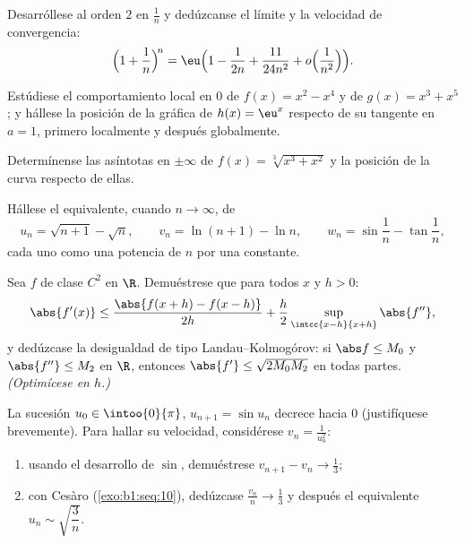 \begin{exercise}[$\star\star$]\label{exo:b1:taylor:5}
Desarróllese al orden $2$ en $\frac1n$ y dedúzcanse el límite y la
velocidad de convergencia:
\[
\Bigl(1 + \frac 1n\Bigr)^{\!n}
= \eu\Bigl(1 - \frac{1}{2n} + \frac{11}{24n^2} +
o\Bigl(\frac{1}{n^2}\Bigr)\Bigr).
\]
\end{exercise}

\begin{exercise}[$\star\star$]\label{exo:b1:taylor:6}
Estúdiese el comportamiento local en $0$ de $f(x) = x^2 - x^4$ y de
$g(x) = x^3 + x^5$; y hállese la posición de la gráfica de
$h(x) = \eu^x$ respecto de su tangente en $a = 1$, primero localmente
y después globalmente.
\end{exercise}

\begin{exercise}[$\star\star$]\label{exo:b1:taylor:7}
Determínense las asíntotas en $\pm\infty$ de
$f(x) = \sqrt[3]{x^3 + x^2}$ y la posición de la curva respecto de
ellas.
\end{exercise}

\begin{exercise}[$\star\star$]\label{exo:b1:taylor:8}
Hállese el equivalente, cuando $n \to \infty$, de
\[
u_n = \sqrt{n+1} - \sqrt n, \qquad
v_n = \ln(n+1) - \ln n, \qquad
w_n = \sin\frac{1}{n} - \tan\frac{1}{n},
\]
cada uno como una potencia de $n$ por una constante.
\end{exercise}

\begin{exercise}[$\star\star\star$]\label{exo:b1:taylor:9}
Sea $f$ de clase $C^2$ en $\R$. Demuéstrese que para todos $x$ y $h > 0$:
\[
\abs{f'(x)} \leq \frac{\abs{f(x+h) - f(x-h)}}{2h} +
\frac{h}{2}\sup_{\intcc{x-h}{x+h}}\abs{f''} ,
\]
y dedúzcase la desigualdad de tipo Landau--Kolmogórov: si
$\abs f \leq M_0$ y $\abs{f''} \leq M_2$ en $\R$, entonces
$\abs{f'} \leq \sqrt{2 M_0 M_2}$ en todas partes.
\emph{(Optimícese en $h$.)}
\end{exercise}

\begin{exercise}[$\star\star\star$]\label{exo:b1:taylor:10}
La sucesión $u_0 \in \intoo{0}{\pi}$, $u_{n+1} = \sin u_n$ decrece
hacia $0$ (justifíquese brevemente). Para hallar su velocidad,
considérese $v_n = \frac{1}{u_n^2}$:
\begin{enumerate}
  \item usando el desarrollo de $\sin$, demuéstrese
        $v_{n+1} - v_n \to \frac13$;
  \item con Cesàro (\cref{exo:b1:seq:10}), dedúzcase
        $\frac{v_n}{n} \to \frac13$ y después el equivalente
        $u_n \sim \sqrt{\dfrac{3}{n}}$.
\end{enumerate}
\end{exercise}

